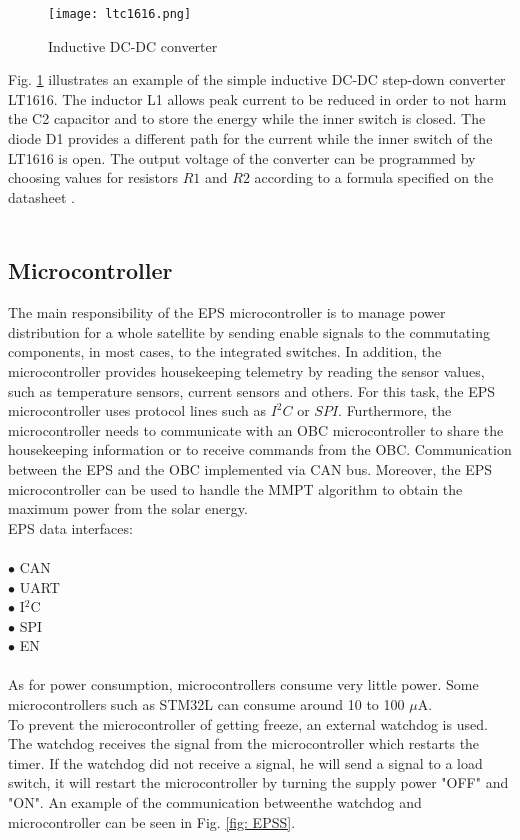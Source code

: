 \begin{figure}[h]
	\centering
	\texttt{[image: ltc1616.png]}
	\caption{ Inductive DC-DC converter \cite{19}}
	\label{fig: EPS41}
\end{figure}

Fig. \ref{fig: EPS41} illustrates an example of the simple inductive DC-DC step-down converter LT1616. The inductor L1 allows peak current to be reduced in order to not harm the C2 capacitor and to store the energy while the inner switch is closed. The diode D1 provides a different path for the current while the inner switch of the LT1616 is open. The output voltage of the converter can be programmed by choosing values for resistors $R1$ and $R2$ according to a formula specified on the datasheet \cite{19} . 
\\
\\

\subsection{Microcontroller \label{sec:tech}}
The main responsibility of the EPS microcontroller is to manage power distribution for a whole satellite by sending enable signals to the commutating components, in most cases, to the integrated switches. In addition, the microcontroller provides housekeeping telemetry by reading the sensor values, such as temperature sensors, current sensors and others. For this task, the EPS microcontroller uses protocol lines such as $I^{2}C$ or $SPI$. Furthermore, the microcontroller needs to communicate with an OBC microcontroller to share the housekeeping information or to receive commands from the OBC. Communication between the EPS and the OBC implemented via CAN bus. Moreover, the EPS microcontroller can be used to handle the MMPT algorithm to obtain the maximum power from the solar energy. 	
\\

EPS data interfaces:\\ \\
$\bullet$ CAN\\
$\bullet$ UART\\
$\bullet$ I$^{2}$C\\
$\bullet$  SPI\\
$\bullet$  EN\\
\\
As for power consumption, microcontrollers consume very little power. Some microcontrollers such as STM32L  can consume  around 10 to 100 $\mu$A.\\
To prevent the microcontroller of getting freeze, an external watchdog is used. The watchdog receives the signal from the microcontroller which restarts the timer. If the watchdog did not receive a signal, he will send a signal to a load switch, it will restart the microcontroller by turning the supply power "OFF" and "ON". An example of the communication betweenthe watchdog and microcontroller can be seen in Fig. \ref{fig: EPSS}.

